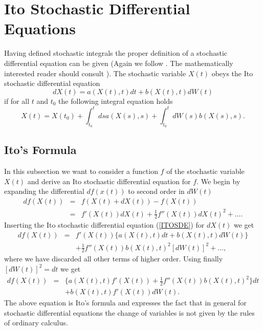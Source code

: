 \section{Ito Stochastic Differential Equations}
Having defined stochastic integrals the proper definition of a
stochastic differential equation can be given (Again we follow 
\cite{gardiner}. The mathematically interested reader should
consult \cite{GARD,KLOEDEN_AN,POTTER}). The stochastic variable
$X(t)$ obeys the Ito stochastic differential equation
\begin{equation}
\label{ITOSDE}
dX(t) = a(X(t),t) dt + b(X(t),t) dW(t)
\end{equation}
if for all $t$ and $t_0$ the following integral equation holds
\begin{equation}
X(t) = X(t_0) + \int_{t_0}^t ds a(X(s),s) 
     + \int_{t_0}^t dW(s) b(X(s),s).
\end{equation}

\subsection{Ito's Formula}
In this subsection we want to consider a function
$f$ of the stochastic variable $X(t)$ and derive an Ito stochastic
differential equation for $f$. We begin by expanding the differential 
$df(x(t))$ to second order in $dW(t)$
\begin{eqnarray*}
df(X(t)) & = & f(X(t)+dX(t)) - f(X(t)) \\
         & = & f'(X(t)) dX(t) + \frac{1}{2} f''(X(t)) dX(t)^2 + \ldots.
\end{eqnarray*}
Inserting the Ito stochastic differential equation (\ref{ITOSDE})
for $dX(t)$ we get
\begin{eqnarray*}
df(X(t)) &=&  f'(X(t)) \{a(X(t),t)dt + b(X(t),t) dW(t) \} \\
      & & + \frac{1}{2} f''(X(t)) b(X(t),t)^2 [dW(t)]^2 + \ldots ,
\end{eqnarray*}
where we have discarded all other terms of higher order. Using
finally $[dW(t)]^2 =dt$ we get
\begin{eqnarray}
\label{ITOFORMULA}
df(X(t)) &=& \{a(X(t),t) f'(X(t)) +  \frac{1}{2} f''(X(t)) b(X(t),t)^2
\} dt  \nonumber \\
    & & + b(X(t),t)f'(X(t)) dW(t).
\end{eqnarray}
The above equation is Ito's formula and expresses the fact that 
in general for stochastic differential equations
the change of variables is not given by the rules of 
ordinary calculus.


